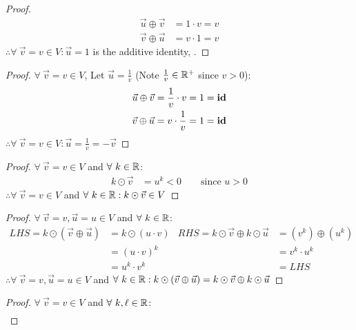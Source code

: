 \begin{enumerate}
\begin{proof}
    \begin{align*}
      \vec{u} \oplus \vec{v} & = 1 \cdot v = v \\
      \vec{v} \oplus \vec{u} & = v \cdot 1 = v
    \end{align*}
    $\therefore \forall~\vec{v} = v \in V: \vec{u} = 1$ is the additive identity, .
  \end{proof}
  \begin{proof}
    $\forall~\vec{v} = v \in V$, Let $\vec{u} = \frac{1}{v}$ (Note $\frac{1}{v} \in \mathbb{R}^+$ since $v > 0$):
    \begin{align*}
      \vec{u} \oplus \vec{v} & = \frac{1}{v} \cdot v = 1 = \text{\textbf{id}} \\
      \vec{v} \oplus \vec{u} & = v \cdot \frac{1}{v} = 1 = \text{\textbf{id}}
    \end{align*}
    $\therefore \forall~\vec{v} = v \in V: \vec{u} = \frac{1}{v} = -\vec{v}$
  \end{proof}
  \begin{proof}
    $\forall~\vec{v} = v \in V$ and $\forall~k \in \mathbb{R}$:
    \begin{align*}
      k \odot \vec{v} & = u^k < 0 \qquad \text{since $u>0$}
    \end{align*}
    $\therefore \forall~\vec{v} = v \in V$ and $\forall~k \in \mathbb{R}: k \odot \vec{v} \in V$
  \end{proof}
  \begin{proof}
    $\forall~\vec{v} = v,\vec{u} = u \in V$ and $\forall~k \in \mathbb{R}$:
    \begin{align*}
      LHS = k \odot (\vec{v} \oplus \vec{u}) & = k \odot (u \cdot v) & RHS = k \odot \vec{v} \oplus k \odot \vec{u} & = (v^k) \oplus (u^k) \\
                                             & = (u \cdot v)^k       &                                              & = v^k \cdot u^k      \\
                                             & = u^k \cdot v^k       &                                              & = LHS
    \end{align*}
    $\therefore \forall~\vec{v} = v,\vec{u} = u \in V$ and $\forall~k \in \mathbb{R}: k \odot (\vec{v} \oplus \vec{u}) = k \odot \vec{v} \oplus k \odot \vec{u}$
  \end{proof}
  \begin{proof}
    $\forall~\vec{v} = v \in V$ and $\forall~k,\ell \in \mathbb{R}$:
    \begin{align*}

\end{align*}
\end{proof}
\end{enumerate}

